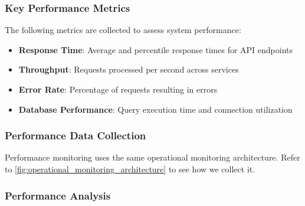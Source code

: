 \subsubsection{Key Performance Metrics}

The following metrics are collected to assess system performance:

\begin{itemize}
    \item \textbf{Response Time}: Average and percentile response times for API endpoints
    \item \textbf{Throughput}: Requests processed per second across services
    \item \textbf{Error Rate}: Percentage of requests resulting in errors
    \item \textbf{Database Performance}: Query execution time and connection utilization
\end{itemize}


\subsubsection{Performance Data Collection}
Performance monitoring uses the same operational monitoring architecture.
Refer to \ref{fig:operational_monitoring_architecture} to see how we collect it.


\subsubsection{Performance Analysis}

